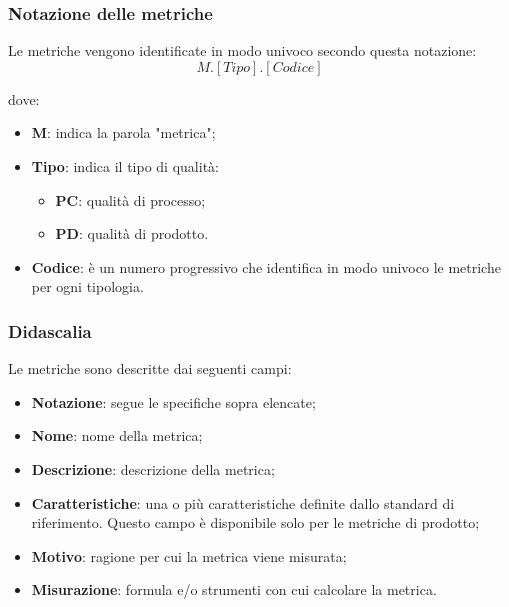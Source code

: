 \subsubsection{Notazione delle metriche}
\par Le metriche vengono identificate in modo univoco secondo questa notazione: 
\[M.[Tipo].[Codice]\]
\par dove: 
\begin{itemize}
    \item \textbf{M}: indica la parola "metrica";
    \item \textbf{Tipo}: indica il tipo di qualità: 
        \begin{itemize}
            \item \textbf{PC}: qualità di processo; 
            \item \textbf{PD}: qualità di prodotto.
        \end{itemize}
    \item \textbf{Codice}: è un numero progressivo che identifica in modo univoco le metriche per ogni tipologia.
\end{itemize}

\subsubsection{Didascalia}
Le metriche sono descritte dai seguenti campi:
\begin{itemize}
    \item \textbf{Notazione}: segue le specifiche sopra elencate;
    \item \textbf{Nome}: nome della metrica;
    \item \textbf{Descrizione}: descrizione della metrica;
    \item \textbf{Caratteristiche}: una o più caratteristiche definite dallo standard di riferimento. Questo campo è disponibile solo per le metriche di prodotto;
    \item \textbf{Motivo}: ragione per cui la metrica viene misurata;
    \item \textbf{Misurazione}: formula e/o strumenti con cui calcolare la metrica.
\end{itemize}

